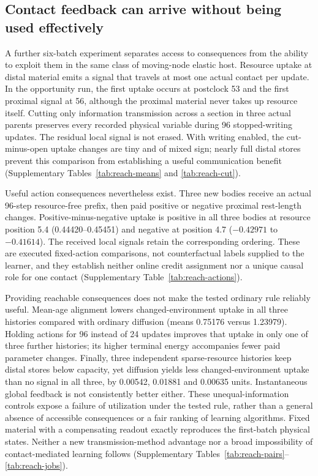 
\subsection*{Contact feedback can arrive without being used effectively}

A further six-batch experiment separates access to consequences from the ability to exploit them in the same class of moving-node elastic host. Resource uptake at distal material emits a signal that travels at most one actual contact per update. In the opportunity run, the first uptake occurs at postclock 53 and the first proximal signal at 56, although the proximal material never takes up resource itself. Cutting only information transmission across a section in three actual parents preserves every recorded physical variable during 96 stopped-writing updates. The residual local signal is not erased. With writing enabled, the cut-minus-open uptake changes are tiny and of mixed sign; nearly full distal stores prevent this comparison from establishing a useful communication benefit (Supplementary Tables~\ref{tab:reach-means} and \ref{tab:reach-cut}).

Useful action consequences nevertheless exist. Three new bodies receive an actual 96-step resource-free prefix, then paid positive or negative proximal rest-length changes. Positive-minus-negative uptake is positive in all three bodies at resource position 5.4 (0.44420--0.45451) and negative at position 4.7 ($-0.42971$ to $-0.41614$). The received local signals retain the corresponding ordering. These are executed fixed-action comparisons, not counterfactual labels supplied to the learner, and they establish neither online credit assignment nor a unique causal role for one contact (Supplementary Table~\ref{tab:reach-actions}).

Providing reachable consequences does not make the tested ordinary rule reliably useful. Mean-age alignment lowers changed-environment uptake in all three histories compared with ordinary diffusion (means 0.75176 versus 1.23979). Holding actions for 96 instead of 24 updates improves that uptake in only one of three further histories; its higher terminal energy accompanies fewer paid parameter changes. Finally, three independent sparse-resource histories keep distal stores below capacity, yet diffusion yields less changed-environment uptake than no signal in all three, by 0.00542, 0.01881 and 0.00635 units. Instantaneous global feedback is not consistently better either. These unequal-information controls expose a failure of utilization under the tested rule, rather than a general absence of accessible consequences or a fair ranking of learning algorithms. Fixed material with a compensating readout exactly reproduces the first-batch physical states. Neither a new transmission-method advantage nor a broad impossibility of contact-mediated learning follows (Supplementary Tables~\ref{tab:reach-pairs}--\ref{tab:reach-jobs}).
